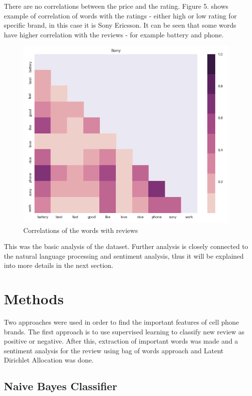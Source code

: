 \documentclass[11pt]{article}
\begin{document}
There are no correlations between the price and the rating. Figure 5. shows example of correlation of words with the ratings - either high or low rating for specific brand, in this case it is Sony Ericsson. It can be seen that some words have higher correlation with the reviews - for example battery and phone. 


\begin{figure}[h!]
  \centering
    \includegraphics[width=\linewidth]{correlations.png}
  \caption{Correlations of the words with reviews}
  \label{fig:correlations}
\end{figure}

This was the basic analysis of the dataset. Further analysis is closely connected to the natural language processing and sentiment analysis, thus it will be explained into more details in the next section. 


\section{Methods}
Two approaches were used in order to find the important features of cell phone brands. The first approach is to use supervised learning to classify new review as positive or negative. After this, extraction of important words was made and a sentiment analysis for the review using bag of words approach and Latent Dirichlet Allocation was done.


\subsection{Naive Bayes Classifier}
\end{document}
